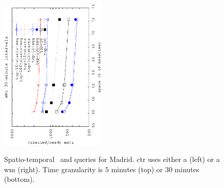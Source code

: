 \begin{figure}[!ht]
\begin{center}
			{\includegraphics[angle=-90,width=0.45\textwidth]{figures_synt/madrid_st_topk_wm_30.eps}}
			
		\end{center}
		\vspace{-0.3cm}
		\caption{Spatio-temporal {\Stk\ and \Stks} queries for Madrid. \acrlong{ctr} uses either a \glsacrlong (left) or a \acrlong{wm} (right). 
			Time granularity is $5$ minutes (top) or $30$ minutes (bottom). 
		}
		\label{fig:madridst.tk}

		\vspace{-0.2cm}
		\begin{center}


\end{center}
\end{figure}

